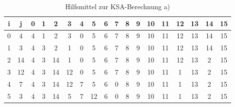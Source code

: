 \documentclass[12pt.twoside,a4paper,notitlepage]{article}
\begin{document}
\begin{enumerate}[a)]
\begin{table}[h]
\centering
\begin{tabular}{|c|c||c|c|c|c|c|c|c|c|c|c|c|c|c|c|c|c|}
\hline
i & j & 0 & 1 & 2 & 3 & 4 & 5 & 6 & 7 & 8 & 9 & 10 & 11 & 12 & 13 & 14 & 15 \\
\hline
0 & 4 & 4 & 1 & 2 & 3 & 0 & 5 & 6 & 7 & 8 & 9 & 10 & 11 & 12 & 13 & 14 & 15 \\
\hline
1 & 3 & 4 & 3 & 2 & 1 & 0 & 5 & 6 & 7 & 8 & 9 & 10 & 11 & 12 & 13 & 14 & 15 \\
\hline
2 & 14 & 4 & 3 & 14 & 1 & 0 & 5 & 6 & 7 & 8 & 9 & 10 & 11 & 12 & 13 & 2 & 15 \\
\hline
3 & 12 & 4 & 3 & 14 & 12 & 0 & 5 & 6 & 7 & 8 & 9 & 10 & 11 & 1 & 13 & 2 & 15 \\
\hline
4 & 7 & 4 & 3 & 14 & 12 & 7 & 5 & 6 & 0 & 8 & 9 & 10 & 11 & 1 & 13 & 2 & 15 \\
\hline
5 & 3 & 4 & 3 & 14 & 5 & 7 & 12 & 6 & 0 & 8 & 9 & 10 & 11 & 1 & 13 & 2 & 15 \\
\hline
\end{tabular}
\caption{Hilfsmittel zur KSA-Berechnung a)}
\label{tab:ksa}
\end{table}


\end{enumerate}
\end{document}
